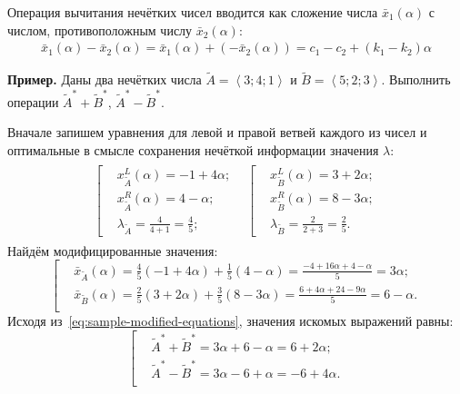 Операция вычитания нечётких чисел вводится как сложение числа $\bar{x}_1\left(\alpha \right)$ с числом, противоположным числу $\bar{x}_2\left( \alpha  \right)$:
\begin{gather*}
  \bar{x}_1\left(\alpha \right)-\bar{x}_2\left(\alpha \right)=\bar{x}_1\left(\alpha \right)+\left(-\bar{x}_2\left(\alpha \right) \right)=c_1-c_2+\left( k_1-k_2 \right)\alpha
\end{gather*}

\textbf{Пример.} Даны два нечётких числа $\tilde A=\left\langle 3;4;1 \right\rangle $ и $\tilde B=\left\langle 5;2;3 \right\rangle$. Выполнить операции $\tilde A^{*}+ \tilde B^{*}$, $\tilde A^{*}-\tilde B^{*}$.

Вначале запишем уравнения для левой и правой ветвей каждого из чисел и оптимальные в смысле сохранения нечёткой информации значения $\lambda $:
\begin{gather*}
\begin{matrix}
  \left[ \begin{aligned}
    & x_{\tilde A}^{L}\left( \alpha  \right)=-1+4\alpha;  \\ 
    & x_{\tilde A}^{R}\left( \alpha  \right)=4-\alpha;  \\ 
    & \lambda_{\tilde A}=\frac{4}{4+1}=\frac{4}{5};
  \end{aligned} \right.
  &
  \left[ \begin{aligned}
    & x_{\tilde B}^{L}\left( \alpha  \right)=3+2\alpha;  \\ 
    & x_{\tilde B}^{R}\left( \alpha  \right)=8-3\alpha;  \\ 
    & \lambda_{\tilde B}=\frac{2}{2+3}=\frac{2}{5}.
\end{aligned} \right.
\end{matrix}
\end{gather*}
Найдём модифицированные значения:
\begin{equation}
\label{eq:sample-modified-equations}
  \left[ \begin{aligned}
    & \bar{x}_{\tilde A}\left( \alpha  \right)=\frac{4}{5}\left( -1+4\alpha  \right)+\frac{1}{5}\left( 4-\alpha  \right)=\frac{-4+16\alpha +4-\alpha }{5}=3\alpha;  \\ 
    & \bar{x}_{\tilde B}\left( \alpha  \right)=\frac{2}{5}\left( 3+2\alpha  \right)+\frac{3}{5}\left( 8-3\alpha  \right)=\frac{6+4\alpha +24-9\alpha }{5}=6-\alpha.  \\ 
  \end{aligned} \right.
\end{equation}
Исходя из~\eqref{eq:sample-modified-equations}, значения искомых выражений равны:
\begin{equation*}
  \left[ \begin{aligned}
    & \tilde A^{*}+ \tilde B^{*}=3\alpha +6-\alpha =6+2\alpha; \\ 
    & \tilde A^{*}-\tilde B^{*}=3\alpha -6+\alpha =-6+4\alpha. \\ 
  \end{aligned} \right. 
\end{equation*}

